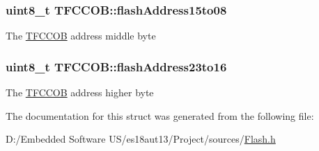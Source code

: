 \subsubsection[{flash\+Address15to08}]{\setlength{\rightskip}{0pt plus 5cm}uint8\+\_\+t T\+F\+C\+C\+O\+B\+::flash\+Address15to08}\label{struct_t_f_c_c_o_b_a96b625dc57b3ecdf9ceca8045404bc6b}
The \hyperlink{struct_t_f_c_c_o_b}{T\+F\+C\+C\+O\+B} address middle byte \hypertarget{struct_t_f_c_c_o_b_a41e7ea5bf2b3dd4e0decbbbae999ca94}{}
\subsubsection[{flash\+Address23to16}]{\setlength{\rightskip}{0pt plus 5cm}uint8\+\_\+t T\+F\+C\+C\+O\+B\+::flash\+Address23to16}\label{struct_t_f_c_c_o_b_a41e7ea5bf2b3dd4e0decbbbae999ca94}
The \hyperlink{struct_t_f_c_c_o_b}{T\+F\+C\+C\+O\+B} address higher byte 

The documentation for this struct was generated from the following file\+:\begin{DoxyCompactItemize}
\item 
D\+:/\+Embedded Software U\+S/es18aut13/\+Project/sources/\hyperlink{_flash_8h}{Flash.\+h}\end{DoxyCompactItemize}
